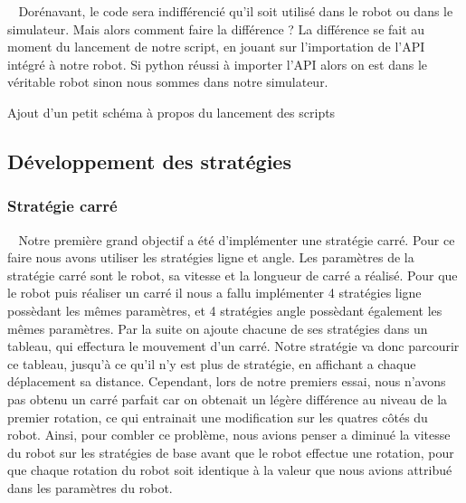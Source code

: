 \documentclass[12pt]{article}
\def\tab{$\>\>\>\>$}
\begin{document}
\tab Dorénavant, le code sera indifférencié qu'il soit utilisé dans le robot ou dans le simulateur. Mais alors comment faire la différence ? La différence se fait au moment du lancement de notre script, en jouant sur l'importation de l'API intégré à notre robot. Si python réussi à importer l'API alors on est dans le véritable robot sinon nous sommes dans notre simulateur.

\begin{center}
Ajout d'un petit schéma à propos du lancement des scripts
\end{center}

\newpage
\subsection{Développement des stratégies}
\subsubsection{Stratégie carré}
\tab Notre première grand objectif a été d'implémenter une stratégie carré. Pour ce faire nous avons utiliser les stratégies ligne et angle. Les paramètres de la stratégie carré sont le robot, sa vitesse et la longueur de carré a réalisé. Pour que le robot puis réaliser un carré il nous a fallu implémenter 4 stratégies ligne possèdant les mêmes paramètres, et 4 stratégies angle possèdant également les mêmes paramètres. Par la suite on ajoute chacune de ses stratégies dans un tableau, qui effectura le mouvement d'un carré. Notre stratégie va donc parcourir ce tableau, jusqu'à ce qu'il n'y est plus de stratégie, en affichant a chaque déplacement sa distance. Cependant, lors de notre premiers essai, nous n'avons pas obtenu un carré parfait car on obtenait un légère différence au niveau de la premier rotation, ce qui entrainait une modification sur les quatres côtés du robot. Ainsi, pour combler ce problème, nous avions penser a diminué la vitesse du robot sur les stratégies de base avant que le robot effectue une rotation, pour que chaque rotation du robot soit identique à la valeur que nous avions attribué dans les paramètres du robot.
\end{document}
